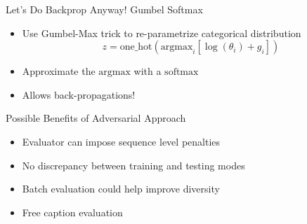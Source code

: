 \documentclass{beamer}
\begin{document}
\begin{frame}{Let's Do Backprop Anyway!}
    Gumbel Softmax~\cite{jang2016categorical, maddison2016concrete}
    \begin{itemize}
        \item Use Gumbel-Max trick to re-parametrize categorical distribution
        \begin{equation*}
                z = \text{one\_hot}(\text{argmax}_i[\log(\theta_i)+ g_i])
        \end{equation*}
        \item Approximate the $\text{argmax}$ with a $\text{softmax}$ 
        \item Allows back-propagations!
    \end{itemize}
\end{frame}
\begin{frame}{Possible Benefits of Adversarial Approach}
    \begin{itemize}
        \item Evaluator can impose sequence level penalties 
        \item No discrepancy between training and testing modes 
        \item Batch evaluation could help improve diversity 
        \item Free caption evaluation~\cite{kannan2016}
    \end{itemize}
\end{frame}
\end{document}

